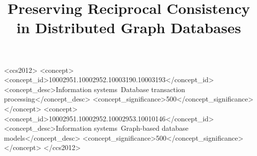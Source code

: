 \documentclass[sigplan,10pt]{acmart}
\begin{document}
\title{Preserving Reciprocal Consistency in Distributed Graph Databases}



\renewcommand{\shortauthors}{Waudby, et al.}



\begin{CCSXML}
<ccs2012>
   <concept>
       <concept_id>10002951.10002952.10003190.10003193</concept_id>
       <concept_desc>Information systems~Database transaction processing</concept_desc>
       <concept_significance>500</concept_significance>
       </concept>
   <concept>
       <concept_id>10002951.10002952.10002953.10010146</concept_id>
       <concept_desc>Information systems~Graph-based database models</concept_desc>
       <concept_significance>500</concept_significance>
       </concept>
 </ccs2012>
\end{CCSXML}



\maketitle





















\appendix


\end{document}
